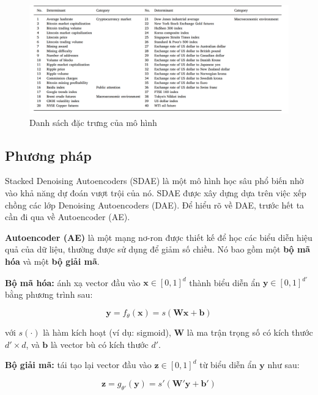 \begin{figure}[h!]
    \centering
    \includegraphics[width=\textwidth]{images/chapter5/feature.png}
    \caption{Danh sách đặc trưng của mô hình}
    \label{fig:feature}
\end{figure}

\newpage

\subsection{Phương pháp}
Stacked Denoising Autoencoders (SDAE) là một mô hình học sâu phổ biến nhờ vào khả năng dự đoán vượt trội của nó. SDAE được xây dựng dựa trên việc xếp chồng các lớp Denoising Autoencoders (DAE). Để hiểu rõ về DAE, trước hết ta cần đi qua về Autoencoder (AE).


\textbf{Autoencoder (AE)} là một mạng nơ-ron được thiết kế để học các biểu diễn hiệu quả của dữ liệu, thường được sử dụng để giảm số chiều. Nó bao gồm một \textbf{bộ mã hóa} và một \textbf{bộ giải mã}.

\textbf{Bộ mã hóa:} ánh xạ vector đầu vào $\mathbf{x} \in [0, 1]^d$ thành biểu diễn ẩn $\mathbf{y} \in [0, 1]^{d'}$ bằng phương trình sau:

\begin{equation}
    \mathbf{y} = f_\theta(\mathbf{x}) = s(\mathbf{W} \mathbf{x} + \mathbf{b})
\end{equation}

với $s(\cdot)$ là hàm kích hoạt (ví dụ: sigmoid), $\mathbf{W}$ là ma trận trọng số có kích thước $d' \times d$, và $\mathbf{b}$ là vector bù có kích thước $d'$.

\textbf{Bộ giải mã:} tái tạo lại vector đầu vào $\mathbf{z} \in [0, 1]^d$ từ biểu diễn ẩn $\mathbf{y}$ như sau:

\begin{equation}
    \mathbf{z} = g_{\theta'}(\mathbf{y}) = s'(\mathbf{W'} \mathbf{y} + \mathbf{b'})
\end{equation}

